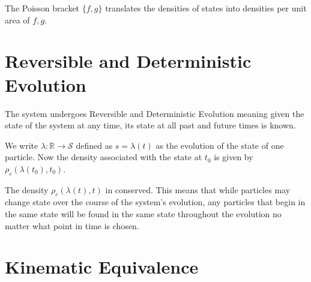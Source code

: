 \documentclass{article}
\begin{document}
\begin{prop}
	The Poisson bracket $\{f, g\}$ translates the densities of states into densities per unit area of $f, g$.
\end{prop}
	
\section{Reversible and Deterministic Evolution}

\begin{assump}
	The system undergoes Reversible and Deterministic Evolution meaning given the state of the system at any time, its state at all past and future times is known.
\end{assump}

\begin{defn}
	We write $\lambda: \mathbb{R} \rightarrow \mathcal{S}$ defined as $s = \lambda(t)$ as the evolution of the state of one particle. Now the density associated with the state at $t_0$ is given by $\rho_c(\lambda(t_0),t_0)$.
\end{defn}

\begin{prop}
	The density $\rho_c(\lambda(t),t)$ in conserved. This means that while particles may change state over the course of the system's evolution, any particles that begin in the same state will be found in the same state throughout the evolution no matter what point in time is chosen.
\end{prop}

	




\section{Kinematic Equivalence}
\end{document}
